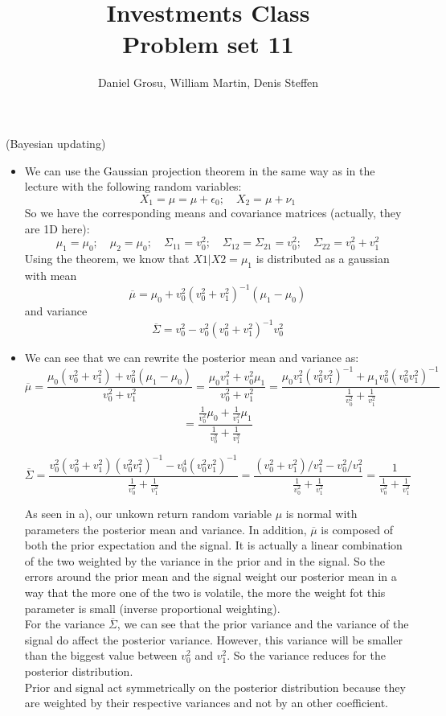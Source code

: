 \documentclass[10pt]{article}
\newenvironment{exercise}[2][Exercise]{\begin{trivlist}
  \item[\hskip \labelsep {\bfseries #1}\hskip \labelsep {\bfseries #2.}]}{\end{trivlist}}
\begin{document}
  \pagecolor{solar}
	
  \renewcommand{\qedsymbol}{\smiley}
	\title{Investments Class \\ Problem set 11}
	\author{Daniel Grosu, William Martin, Denis Steffen}
		
\maketitle

\begin{exercise} 1 (Bayesian updating)
\begin{itemize}
	\item[a)] We can use the Gaussian projection theorem in the same way as in the lecture with the following random variables: 
	$$ X_1 = \mu = \mu + \epsilon_0 ; \quad X_2 = \mu + \nu_1$$ So we have the corresponding means and covariance matrices (actually, they are 1D here): 
	$$ \mu_1 = \mu_0 ; \quad \mu_2 = \mu_0 ; \quad \Sigma_{11} = v_0^2; \quad \Sigma_{12} = \Sigma_{21} = v_0^2; \quad \Sigma_{22} = v_0^2 + v_1^2$$ Using the theorem, we know that $X1|X2 = \mu_1$ is distributed as a gaussian with mean $$ \overline{\mu} = \mu_0 + v_0^2(v_0^2 + v_1^2)^{-1}(\mu_1 - \mu_0)$$ and variance $$ \overline{\Sigma} = v_0^2 - v_0^2(v_0^2 + v_1^2)^{-1}v_0^2$$
	\item[b)] We can see that we can rewrite the posterior mean and variance as:
	$$ \overline{\mu} = \frac{\mu_0(v_0^2  + v_1^2) + v_0^2(\mu_1-\mu_0)}{v_0^2  + v_1^2} = \frac{\mu_0v_1^2 + v_0^2\mu_1}{v_0^2  + v_1^2} = \frac{\mu_0v_1^2(v_0^2v_1^2)^{-1} + \mu_1v_0^2(v_0^2v_1^2)^{-1}}{\frac{1}{v_0^2}  + \frac{1}{v_1^2}} $$ $$= \frac{\frac{1}{v_0^2}\mu_0 + \frac{1}{v_1^2}\mu_1}{\frac{1}{v_0^2}  + \frac{1}{v_1^2}} $$ 

	$$ \overline{\Sigma} = \frac{v_0^2(v_0^2 + v_1^2)(v_0^2v_1^2)^{-1} - v_0^4(v_0^2v_1^2)^{-1}}{\frac{1}{v_0^2}  + \frac{1}{v_1^2}} = \frac{(v_0^2 + v_1^2)/v_1^2 - v_0^2/v_1^2}{\frac{1}{v_0^2}  + \frac{1}{v_1^2}} = \frac{1}{\frac{1}{v_0^2}  + \frac{1}{v_1^2}}$$

	As seen in a), our unkown return random variable $\mu$ is normal with parameters the posterior mean and variance. In addition, $\overline{\mu}$ is composed of both the prior expectation and the signal. It is actually a linear combination of the two weighted by the variance in the prior and in the signal. So the errors around the prior mean and the signal weight our posterior mean in a way that the more one of the two is volatile, the more the weight fot this parameter is small (inverse proportional weighting). \\
	For the variance $\overline{\Sigma}$, we can see that the prior variance and the variance of the signal do affect the posterior variance. However, this variance will be smaller than the biggest value between $v_0^2$ and $v_1^2$. So the variance reduces for the posterior distribution. \\
	Prior and signal act symmetrically on the posterior distribution because they are weighted by their respective variances and not by an other coefficient. 


\end{itemize}
\end{exercise}
\end{document}
